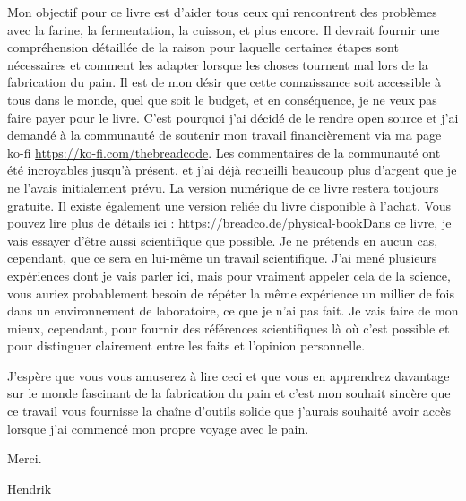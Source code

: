 Mon objectif pour ce livre est d'aider tous ceux qui rencontrent des problèmes avec la farine, la fermentation, la cuisson, et plus encore. Il devrait fournir une compréhension détaillée de la raison pour laquelle certaines étapes sont nécessaires et comment les adapter lorsque les choses tournent mal lors de la fabrication du pain.
Il est de mon désir que cette connaissance soit accessible à tous dans le monde, quel que soit le budget, et en conséquence, je ne veux pas faire payer pour le livre. C'est pourquoi j'ai décidé de le rendre open source et j'ai demandé à la communauté de soutenir mon travail financièrement via ma page ko-fi \url{https://ko-fi.com/thebreadcode}. Les commentaires de la communauté ont été incroyables jusqu'à présent, et j'ai déjà recueilli beaucoup plus d'argent que je ne l'avais initialement prévu. La version numérique de ce livre restera toujours gratuite. Il existe également une version reliée du livre disponible à l'achat.
Vous pouvez lire plus de détails ici : \url{https://breadco.de/physical-book}Dans ce livre, je vais essayer d'être aussi scientifique que possible. Je ne prétends en aucun cas, cependant, que
ce sera en lui-même un travail scientifique. J'ai mené plusieurs expériences dont je vais parler
ici, mais pour vraiment appeler cela de la science, vous auriez probablement besoin de répéter la même expérience
un millier de fois dans un environnement de laboratoire, ce que je n'ai pas fait. Je vais faire de mon mieux, cependant, pour fournir
des références scientifiques là où c'est possible et pour distinguer clairement entre les faits et l'opinion personnelle.

J'espère que vous vous amuserez à lire ceci et que vous en apprendrez davantage sur le monde fascinant de la fabrication du pain
et c'est mon souhait sincère que ce travail vous fournisse la chaîne d'outils solide que j'aurais souhaité
avoir accès lorsque j'ai commencé mon propre voyage avec le pain.

Merci.

Hendrik